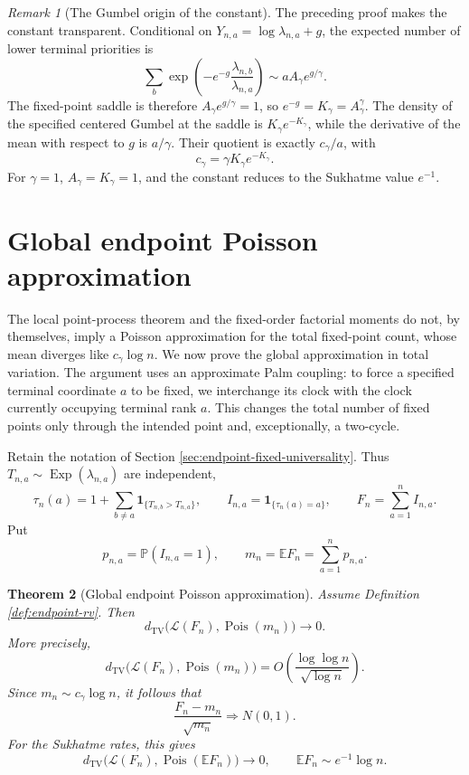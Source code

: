 \documentclass[11pt]{article}
\newtheorem{theorem}{Theorem}[section]
\theoremstyle{remark}
\newtheorem{remark}[theorem]{Remark}
\newcommand{\Pp}{\mathbb P}
\newcommand{\Ee}{\mathbb E}
\newcommand{\one}{\mathbf 1}
\newcommand{\TV}{\mathrm{TV}}
\newcommand{\Pois}{\operatorname{Pois}}
\newcommand{\Exp}{\operatorname{Exp}}
\begin{document}
\begin{remark}[The Gumbel origin of the constant]\label{rem:gumbel-endpoint-constant}
The preceding proof makes the constant transparent.  Conditional on
\(Y_{n,a}=\log\lambda_{n,a}+g\), the expected number of lower terminal priorities
is
\[
        \sum_b\exp\left(-e^{-g}\frac{\lambda_{n,b}}{\lambda_{n,a}}\right)
        \sim aA_\gamma e^{g/\gamma}.
\]
The fixed-point saddle is therefore
\(A_\gamma e^{g/\gamma}=1\), so
\(e^{-g}=K_\gamma=A_\gamma^\gamma\).  The density of the specified centered
Gumbel at the saddle is \(K_\gamma e^{-K_\gamma}\), while the derivative of the
mean with respect to \(g\) is \(a/\gamma\).  Their quotient is exactly
\(c_\gamma/a\), with
\[
        c_\gamma=\gamma K_\gamma e^{-K_\gamma}.
\]
For \(\gamma=1\), \(A_\gamma=K_\gamma=1\), and the constant reduces to the
Sukhatme value \(e^{-1}\).
\end{remark}

\section{Global endpoint Poisson approximation}\label{sec:global-endpoint-poisson}

The local point-process theorem and the fixed-order factorial moments do not, by
themselves, imply a Poisson approximation for the total fixed-point count, whose
mean diverges like $c_\gamma\log n$.  We now prove the global approximation in
total variation.  The argument uses an approximate Palm coupling: to force a
specified terminal coordinate $a$ to be fixed, we interchange its clock with the
clock currently occupying terminal rank $a$.  This changes the total number of
fixed points only through the intended point and, exceptionally, a two-cycle.

Retain the notation of Section \ref{sec:endpoint-fixed-universality}.  Thus
$T_{n,a}\sim\Exp(\lambda_{n,a})$ are independent,
\[
        \tau_n(a)=1+\sum_{b\ne a}\one_{\{T_{n,b}>T_{n,a}\}},
        \qquad
        I_{n,a}=\one_{\{\tau_n(a)=a\}},
        \qquad
        F_n=\sum_{a=1}^n I_{n,a}.
\]
Put
\[
        p_{n,a}=\Pp(I_{n,a}=1),
        \qquad
        m_n=\Ee F_n=\sum_{a=1}^n p_{n,a}.
\]

\begin{theorem}[Global endpoint Poisson approximation]\label{thm:global-endpoint-poisson}
Assume Definition \ref{def:endpoint-rv}.  Then
\[
        d_{\TV}\bigl(\mathcal L(F_n),\Pois(m_n)\bigr)\longrightarrow0.
\]
More precisely,
\[
        d_{\TV}\bigl(\mathcal L(F_n),\Pois(m_n)\bigr)
        =O\!\left(\frac{\log\log n}{\sqrt{\log n}}\right).
\]
Since $m_n\sim c_\gamma\log n$, it follows that
\[
        \frac{F_n-m_n}{\sqrt{m_n}}\Rightarrow N(0,1).
\]
For the Sukhatme rates, this gives
\[
        d_{\TV}\bigl(\mathcal L(F_n),\Pois(\Ee F_n)\bigr)\to0,
        \qquad
        \Ee F_n\sim e^{-1}\log n.
\]
\end{theorem}
\end{document}
